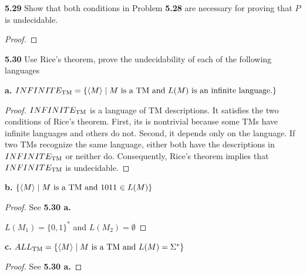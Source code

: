 \textbf{5.29} 
Show that both conditions in Problem \textbf{5.28} are necessary for proving that $P$ is undecidable.
\begin{mdframed}
\begin{proof}

\end{proof}
\end{mdframed}

\textbf{5.30} Use Rice's theorem, prove the undecidability of each of the following languages

\label{lang:INFINITETM_UDCDB}
\textbf{a.} $INFINITE_{\text{TM}} = \{ \langle{M}\rangle \mid \text{$M$ is a TM and $L(M)$ is an infinite language.}\}$

\begin{mdframed}
\begin{proof}
$INFINITE_{\text{TM}}$ is a language of TM descriptions. It satisfies the two conditions of Rice's theorem. First, its is nontrivial because some TMs have infinite languages and others do not. Second, it depends only on the language. If two TMs recognize the same language, either both have the descriptions in $INFINITE_{\text{TM}}$ or neither do. Consequently, Rice's theorem implies that $INFINITE_{\text{TM}}$ is undecidable.
\end{proof}
\end{mdframed}

\textbf{b.} $\{ \langle{M}\rangle \mid \text{$M$ is a TM and 1011 $\in L(M)$}\}$
\begin{mdframed}
\begin{proof}
See \textbf{5.30 a.}

$L(M_1) = \{0, 1\}^*$ and $L(M_2) = \emptyset$
\end{proof}
\end{mdframed}

\label{lang:ALLTM_UDCDB}
\textbf{c.} $ALL_{\text{TM}} = \{ \langle{M}\rangle \mid \text{$M$ is a TM and $L(M) = \Sigma^*$}\}$
\begin{mdframed}
\begin{proof}
See \textbf{5.30 a.}
\end{proof}
\end{mdframed}

